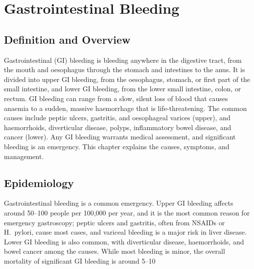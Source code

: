 \chapter{Gastrointestinal Bleeding}

\section*{Definition and Overview}
Gastrointestinal (GI) bleeding is bleeding anywhere in the digestive tract, from the mouth and oesophagus through the stomach and intestines to the anus. It is divided into upper GI bleeding, from the oesophagus, stomach, or first part of the small intestine, and lower GI bleeding, from the lower small intestine, colon, or rectum. GI bleeding can range from a slow, silent loss of blood that causes anaemia to a sudden, massive haemorrhage that is life-threatening. The common causes include peptic ulcers, gastritis, and oesophageal varices (upper), and haemorrhoids, diverticular disease, polyps, inflammatory bowel disease, and cancer (lower). Any GI bleeding warrants medical assessment, and significant bleeding is an emergency. This chapter explains the causes, symptoms, and management.

\section*{Epidemiology}
Gastrointestinal bleeding is a common emergency. Upper GI bleeding affects around 50--100 people per 100,000 per year, and it is the most common reason for emergency gastroscopy; peptic ulcers and gastritis, often from NSAIDs or H.\ pylori, cause most cases, and variceal bleeding is a major risk in liver disease. Lower GI bleeding is also common, with diverticular disease, haemorrhoids, and bowel cancer among the causes. While most bleeding is minor, the overall mortality of significant GI bleeding is around 5--10%


